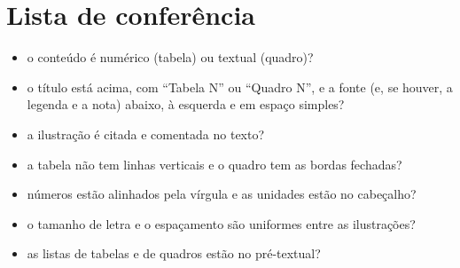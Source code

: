 
\section{Lista de conferência}

\begin{itemize}
  \item o conteúdo é numérico (tabela) ou textual (quadro)?
  \item o título está acima, com ``Tabela N'' ou ``Quadro N'', e a fonte (e, se houver, a
        legenda e a nota) abaixo, à esquerda e em espaço simples?
  \item a ilustração é citada e comentada no texto?
  \item a tabela não tem linhas verticais e o quadro tem as bordas fechadas?
  \item números estão alinhados pela vírgula e as unidades estão no cabeçalho?
  \item o tamanho de letra e o espaçamento são uniformes entre as ilustrações?
  \item as listas de tabelas e de quadros estão no pré-textual?
\end{itemize}
